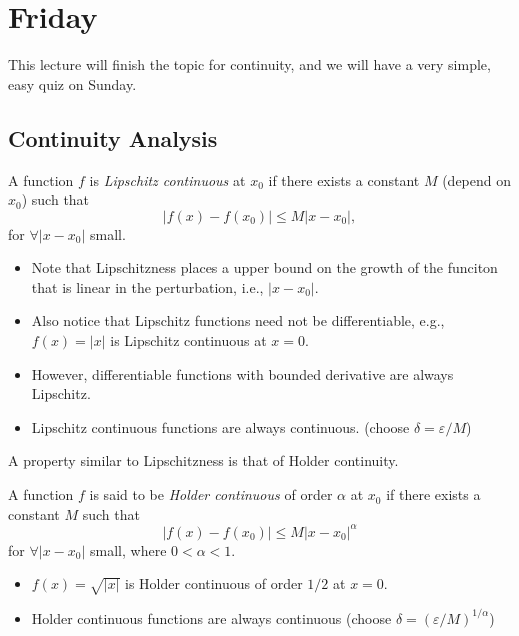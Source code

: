 

\section{Friday}

This lecture will finish the topic for continuity, and we will have a very simple, easy quiz on Sunday.

\subsection{Continuity Analysis}
\begin{definition}
A function $f$ is \emph{Lipschitz continuous} at $x_0$ if there exists a constant $M$ (depend on $x_0$) such that
\[
|f(x) - f(x_0)|\le M|x - x_0|,
\]
for $\forall|x-x_0|$ small.
\end{definition}
\begin{remark}
\begin{itemize}
\item
Note that Lipschitzness places a upper bound on the growth of the funciton that is linear in the perturbation, i.e., $|x-x_0|$. 
\item
Also notice that Lipschitz functions need not be differentiable, e.g., $f(x) = |x|$ is Lipschitz continuous at $x=0$.
\item
However, differentiable functions with bounded derivative are always Lipschitz.
\item
Lipschitz continuous functions are always continuous. (choose $\delta =\varepsilon/M$)
\end{itemize}
\end{remark}
A property similar to Lipschitzness is that of Holder continuity.
\begin{definition}[Holder]
A function $f$ is said to be \emph{Holder continuous} of order $\alpha$ at $x_0$ if there exists a constant $M$ such that 
\[
|f(x) - f(x_0)|\le M|x-x_0|^\alpha
\]
for $\forall |x-x_0|$ small, where $0<\alpha<1$.
\end{definition}
\begin{remark}
\begin{itemize}
\item
$f(x) = \sqrt{|x|}$ is Holder continuous of order $1/2$ at $x=0$.
\item
Holder continuous functions are always continuous (choose $\delta =(\varepsilon/M)^{1/\alpha}$)
\end{itemize}
\end{remark}
